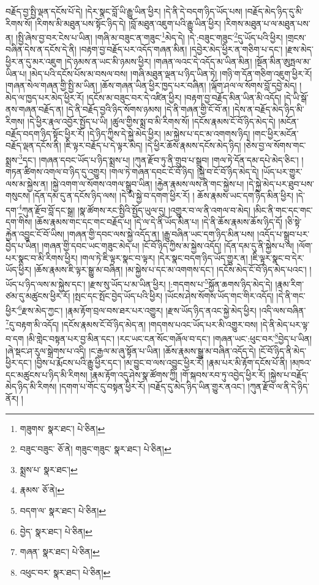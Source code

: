 བརྗོད་བྱ་སྤྱི་ལྡན་དངོས་པོ་དེ། །དེར་སྣང་བློ་ཡི་རྒྱུ་ཡིན་ཕྱིར། །དེ་ནི་དེ་བདག་ཉིད་ཡོད་པས། །བརྗོད་མེད་ཉིད་དུ་མི་རིགས་སོ། །རིགས་མི་མཐུན་པས་སྟོང་ཉིད་དེ། །བློ་མཐུན་འཇུག་པའི་རྒྱུ་ཡིན་ཕྱིར། །རིགས་མཐུན་པ་ལ་མཐུན་པས་ན། །སྤྱི་ཞེས་བྱ་བར་ངེས་པ་ཡིན། །གཞི་མ་བཟུང་ན་གཟུང་\footnote{གཟུགས་  སྣར་ཐང་།  པེ་ཅིན། }མེད་དེ། །དེ་:བཟུང་གཟུང་\footnote{བཟུང་བཟུང་  ཅོ་ནེ། གཟུང་གཟུང་  སྣར་ཐང་།  པེ་ཅིན། }དུ་ཡོད་པའི་ཕྱིར། །གྲངས་བཞིན་དེས་ན་དངོས་དེ་ནི། །བརྟག་བྱ་བརྗོད་པར་འདོད་གཞན་མིན། །དབྱེར་མེད་ཕྱིར་ན་གཅིག་པ་དང་། །རྫས་མེད་ཕྱིར་ན་དུ་མར་འཇུག །དེ་ཉམས་ན་ཡང་མི་ཉམས་ཕྱིར། །གཞན་ལའང་དེ་འདོད་མ་ཡིན་མིན། །སྔོན་མིན་ཨུཏྤལ་མ་ཡིན་པ། །མེད་པའི་དངོས་པོས་མ་བསལ་བས། །གཞི་མཐུན་ལྡན་པ་ཉིད་ཡིན་ཏེ། །གཉི་ག་དོན་གཅིག་འཇུག་ཕྱིར་རོ། །གཞན་སེལ་གཞན་གྱི་སྤྱི་མ་ཡིན། །ཆོས་གཞན་ཡིན་ཕྱིར་ཁྱད་པར་བཞིན། །ལྐོག་ཤལ་ལ་སོགས་བློ་དབྱེ་མེད། །མེད་ལ་ཁྱད་པར་མེད་ཕྱིར་རོ། །དངོས་མ་བཟུང་བར་དེ་འཛིན་ཕྱིར། །བརྟག་བྱ་བརྗོད་མིན་ཡིན་མི་འདོད། །དེ་ཡི་སྒོ་ནས་གཞན་བརྗོད་ན། །དེ་ནི་བརྗོད་བྱའི་ཉིད་སོགས་ཉམས། །དེ་ནི་གཞན་གྱི་ངོ་བོ་ན། །དེས་ན་བརྗོད་མེད་ཉིད་མི་རིགས། །དེ་ཕྱིར་རྣལ་འབྱོར་སྤྱོད་པ་ཡི། །ཚུལ་གྱིས་སྨྲ་བ་མི་རིགས་སོ། །དངོས་རྣམས་ངོ་བོ་ཉིད་མེད་དེ། །མངོན་བརྗོད་བདག་ཉིད་སྟོང་ཕྱིར་རོ། །དེ་ཉིད་ཀྱིས་དེ་སྐྱེ་མེད་ཕྱིར། །མ་སྐྱེས་པ་དང་མ་འགགས་ཉིད། །གང་ཕྱིར་མངོན་བརྗོད་ལྡན་དངོས་ནི། །ཇི་ལྟར་བརྗོད་པ་དེ་ལྟར་མེད། །དེ་ཕྱིར་ཆོས་རྣམས་དངོས་མེད་ཉིད། །ཅེས་བྱ་ལ་སོགས་གང་སྨྲས་\footnote{སྨྲས་པ་  སྣར་ཐང་། }དང་། །གཞན་དབང་ཡོད་པ་ཉིད་སྨྲས་པ། །ཀུན་རྫོབ་ཏུ་ནི་གྲུབ་པ་སྒྲུབ། །གལ་ཏེ་དོན་དམ་དཔེ་མེད་ཅིང་། །གཏན་ཚིགས་འགལ་བ་ཉིད་དུ་འགྱུར། །གལ་ཏེ་གཞན་དབང་ངོ་བོ་ཉིད། །སྐྱེ་བ་ངོ་བོ་ཉིད་མེད་དེ། །ཡོད་པར་གྱུར་ལས་མ་སྐྱེས་ན། །སྐྱེ་འགག་ལ་སོགས་འགལ་སྒྲུབ་ཡིན། །རྐྱེན་རྣམས་ལས་ནི་གང་སྐྱེས་པ། །དེ་སྐྱེ་མེད་པར་ཐུབ་པས་གསུངས། །དོན་དམ་དུ་ན་དངོས་ཉིད་ལས། །དེ་ཡི་སྐྱེ་བ་དགག་ཕྱིར་རོ། །
ཆོས་རྣམས་ཡང་དག་ཉིད་མིན་ཕྱིར། །དེ་དག་\footnote{རྣམས་  ཅོ་ནེ། }ཀུན་རྫོབ་བློ་དང་སྒྲ། །སྣ་ཚོགས་རང་སྤྱིའི་སྤྱོད་ཡུལ་དུ། །འགྱུར་བ་ལ་ནི་འགལ་བ་མེད། །མིང་ནི་གང་དང་གང་དག་གིས། །ཆོས་རྣམས་གང་དང་གང་བརྗོད་པ། །དེ་ལ་དེ་ནི་ཡོད་མིན་པ། །དེ་ནི་ཆོས་རྣམས་ཆོས་ཉིད་དོ། །ཅི་སྟེ་རྐྱེན་འབྱུང་ངོ་བོ་ཡིས། །གཞན་གྱི་དབང་ལས་སྐྱེ་འདོད་ན། །རྒྱུ་བཞིན་ཡང་དག་ཉིད་མིན་པས། །འདོད་པ་སྒྲུབ་པར་བྱེད་པ་ཡིན། །གཞན་གྱི་དབང་ཡང་གཟུང་མེད་པ། །ངོ་བོ་ཉིད་ཀྱིས་མ་སྐྱེས་འདོད། །དོན་དམ་དུ་ནི་སྐྱེས་པ་ལ། །ལོག་པར་སྣང་བ་མི་རིགས་ཕྱིར། །གལ་ཏེ་ཇི་ལྟར་སྣང་བ་ལྟར། །དེར་སྣང་བདག་ཉིད་ཡོད་གྱུར་ན། །ཇི་ལྟར་སྣང་བ་དེར་ཡོད་ཕྱིར། །ཆོས་རྣམས་ཇི་ལྟར་སྒྱུ་མ་བཞིན། །མ་སྐྱེས་པ་དང་མ་འགགས་དང་། །དངོས་མེད་ངོ་བོ་ཉིད་མེད་པའང་། །ཡོད་པ་ཉིད་ལས་མ་སྐྱེས་དང་། །རྫས་སུ་ཡོད་པ་མ་ཡིན་ཕྱིར། །:གདགས་པ་\footnote{བདག་ལ་  སྣར་ཐང་།  པེ་ཅིན། }སྐྱོན་ཆགས་ཉིད་མེད་དེ། །རྣམ་རིག་ཙམ་དུ་མཚུངས་ཕྱིར་རོ། །སྤང་དང་སྤོང་བྱེད་ཡོད་པའི་ཕྱིར། །ཡོངས་ཤེས་སོགས་ཡོད་གང་གིར་འདོད། །དེ་ནི་གང་ཕྱིར་\footnote{བྱེད་  སྣར་ཐང་།  པེ་ཅིན། }རྫས་མེད་ཀྱང་། །རྣམ་རྟོག་བྲལ་བས་ཐར་པར་འགྱུར། །རྫས་ཡོད་ཉིད་ནའང་སྐྱེ་མེད་ཕྱིར། །འདི་ལས་བཞིན་\footnote{གཞན་  སྣར་ཐང་།  པེ་ཅིན། }དུ་བརྟག་མི་འདོད། །དངོས་རྣམས་ངོ་བོ་ཉིད་མེད་ན། །གདགས་པའང་ཡོད་པར་མི་འགྱུར་བས། །དེ་ནི་མེད་པར་ལྟ་བ་དག །མི་གླེང་བསྟན་པར་བྱ་མིན་དང་། །རང་ཡང་ངན་སོང་གཞོལ་བ་དང་། །གཞན་ཡང་:ཕུང་བར་\footnote{འཕུང་བར་  སྣར་ཐང་།  པེ་ཅིན། }བྱེད་པ་ཡིན། །ཞེ་སྡང་ཤ་རུལ་སྒྲེགས་པ་འདི། །ང་རྒྱལ་མ་ཞུ་སྟོན་པ་ཡིན། །ཆོས་རྣམས་སྒྱུ་མ་བཞིན་འདོད་དེ། །ངོ་བོ་ཉིད་ནི་མེད་ཕྱིར་དང་། །བྱིས་པ་རྨོངས་པའི་རྒྱུ་ཕྱིར་དང་། །མ་བྱུང་བ་ལས་འབྱུང་ཕྱིར་རོ། །རྣམ་པར་མི་རྟོག་དངོས་པོ་ནི། །མཁའ་དང་མཚུངས་པ་ཉིད་མི་རིགས། །རྣམ་རྟོག་འདུ་ཤེས་སྣ་ཚོགས་ཀྱི། །གོ་སྐབས་རབ་ཏུ་འབྱེད་ཕྱིར་རོ། །སྐྱེས་པ་བརྗོད་མེད་ཉིད་མི་རིགས། །དགག་པ་གོང་དུ་བསྟན་ཕྱིར་རོ། །བརྗོད་དུ་མེད་ཉིད་ཡིན་གྱུར་ནའང་། །ཀུན་རྫོབ་ལ་ནི་དེ་ཉིད་ནོར། །
